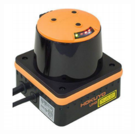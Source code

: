 \documentclass[a4paper]{book}
\begin{document}
\begin{center}
\includegraphics[width=0.5\textwidth]{Figures/Hardware/Partes/Hokuyo.png}
\label{fig:Hardware:Partes:Hokuyo:UHG-08LX}
\end{center}
\end{document}
